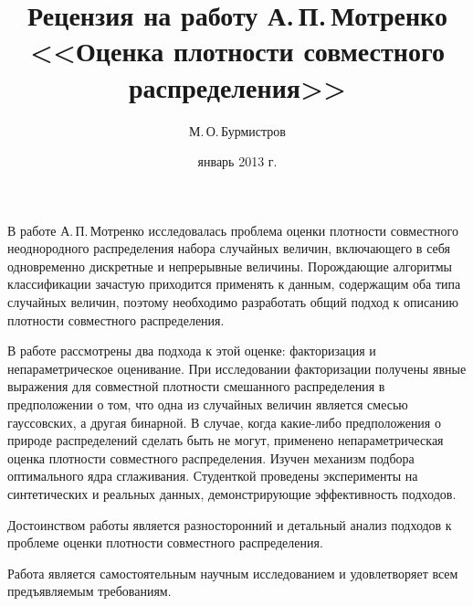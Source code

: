 \documentclass[12pt,a4paper,oneside]{article}
\begin{document}
	\title{Рецензия на работу А.\,П.\,Мотренко \\ <<Оценка плотности совместного распределения>>}
	\author{М.\,О.\,Бурмистров}
	\date{январь 2013 г.}
	\maketitle

В работе А.\,П.\,Мотренко исследовалась проблема оценки плотности совместного неоднородного распределения набора случайных величин, включающего в себя одновременно дискретные и непрерывные величины. 
Порождающие алгоритмы классификации зачастую приходится применять к данным, содержащим оба типа случайных величин, поэтому необходимо разработать общий подход к описанию плотности совместного распределения.

В работе рассмотрены два подхода к этой оценке: факторизация и непараметрическое оценивание. 
При исследовании факторизации получены явные выражения для совместной плотности смешанного распределения в предположении о том, что одна из случайных величин является смесью гауссовских, а другая бинарной. 
В случае, когда какие-либо предположения о природе распределений сделать быть не могут, применено непараметрическая оценка плотности совместного распределения. 
Изучен механизм подбора оптимального ядра сглаживания. 
Студенткой проведены эксперименты на синтетических и реальных данных, демонстрирующие эффективность подходов.

Достоинством работы является разносторонний и детальный анализ подходов к проблеме оценки плотности совместного распределения.

Работа является самостоятельным научным исследованием и удовлетворяет всем предъявляемым требованиям.
\end{document}
